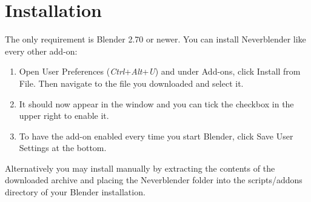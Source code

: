 \chapter{Installation}
The only requirement is Blender 2.70 or newer. You can install Neverblender
like every other add-on: 
\begin{enumerate}
\item Open User Preferences (\textit{Ctrl}+\textit{Alt}+\textit{U}) and under Add-ons, 
click Install from File. Then navigate to the file you downloaded and select it.
\item It should now appear in the window and you can tick the checkbox in the upper right to enable it.
\item To have the add-on enabled every time you start Blender, click Save User Settings at the bottom.
\end{enumerate}

Alternatively you may install manually by extracting the contents of the
downloaded archive and placing the Neverblender folder into the scripts/addons
directory of your Blender installation.
